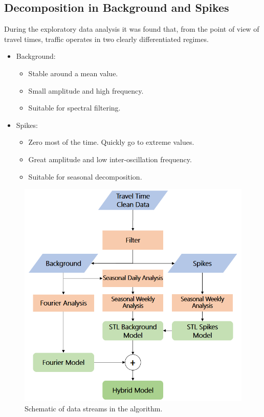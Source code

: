 \documentclass[conference]{IEEEtran}
\begin{document}
\subsection{Decomposition in Background and Spikes}
During the exploratory data analysis it was found that, from the point of view of travel times, traffic operates in two clearly differentiated regimes. 
\begin{itemize}
	\item Background: 
	\begin{itemize}
		\item Stable around a mean value.
		\item Small amplitude and high frequency.
		\item Suitable for spectral filtering.
	\end{itemize}
	\item Spikes: 
	\begin{itemize}
		\item Zero most of the time. Quickly go to extreme values.
		\item Great amplitude and low inter-oscillation frequency.
		\item Suitable for seasonal decomposition.
	\end{itemize}
\end{itemize}

\begin{figure}[htbp]
	\centering
	\includegraphics[width=0.95\linewidth]{new_flow.png}
	\caption{Schematic of data streams in the algorithm.}
	\label{fig:flowchart}
\end{figure}
\end{document}
